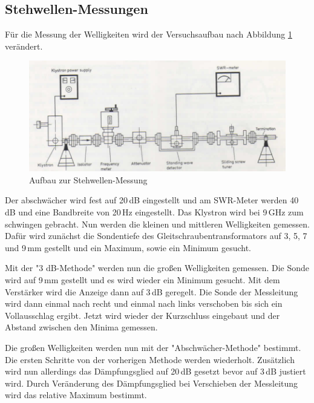     \subsection{Stehwellen-Messungen}
    Für die Messung der Welligkeiten wird der Versuchsaufbau nach Abbildung \ref{fig:aufbauV3} verändert.
    \begin{figure}
      \centering
      \includegraphics[scale=0.8]{pictures/aubauV3.png}
      \caption{Aufbau zur Stehwellen-Messung}
      \label{fig:aufbauV3}
    \end{figure}
    Der abschwächer wird fest auf 20\,dB eingestellt und am SWR-Meter werden 40\,dB und eine Bandbreite von 20\,Hz eingestellt.
    Das Klystron wird bei 9\,GHz zum schwingen gebracht.
    Nun werden die kleinen und mittleren Welligkeiten gemessen.
    Dafür wird zunächst die Sondentiefe des Gleitschraubentransformators auf 3, 5, 7 und 9\,mm gestellt und ein Maximum, sowie ein Minimum gesucht.

    Mit der "3 dB-Methode" werden nun die großen Welligkeiten gemessen.
    Die Sonde wird auf 9\,mm gestellt und es wird wieder ein Minimum gesucht.
    Mit dem Verstärker wird die Anzeige dann auf 3\,dB geregelt.
    Die Sonde der Messleitung wird dann einmal nach recht und einmal nach links verschoben bis sich ein Vollausschlag ergibt.
    Jetzt wird wieder der Kurzschluss eingebaut und der Abstand zwischen den Minima gemessen.

    Die großen Welligkeiten werden nun mit der "Abschwächer-Methode" bestimmt.
    Die ersten Schritte von der vorherigen Methode werden wiederholt.
    Zusätzlich wird nun allerdings das Dämpfungsglied auf 20\,dB gesetzt bevor auf 3\,dB justiert wird.
    Durch Veränderung des Dämpfungsglied bei Verschieben der Messleitung wird das relative Maximum bestimmt.
